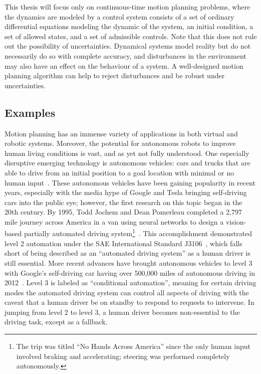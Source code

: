 This thesis will focus only on continuous-time motion planning problems, where the dynamics are modeled by a control system consists of a set of ordinary differential equations modeling the dynamic of the system, an initial condition, a set of allowed states, and a set of admissible controls. Note that this does not rule out the possibility of uncertainties. Dynamical systems model reality but do not necessarily do so with complete accuracy, and disturbances in the environment may also have an effect on the behaviour of a system. A well-designed motion planning algorithm can help to reject disturbances and be robust under uncertainties.



\subsection{Examples}

Motion planning has an immense variety of applications in both virtual and robotic systems. Moreover, the potential for autonomous robots to improve human living conditions is vast, and as yet not fully understood. One especially disruptive emerging technology is autonomous vehicles: cars and trucks that are able to drive from an initial position to a goal location with minimal or no human input~\cite{Thrun2010}. These autonomous vehicles have been gaining popularity in recent years, especially with the media hype of Google and Tesla bringing self-driving cars into the public eye; however, the first research on this topic began in the 20th century. By 1995, Todd Jochem and Dean Pomerleau completed a 2,797 mile journey across America in a van using neural networks to design a vision-based partially automated driving system\footnote{The trip was titled ``No Hands Across America'' since the only human input involved braking and accelerating; steering was performed completely autonomously.}~\cite{Jochem}. This accomplishment demonstrated level 2 automation under the SAE International Standard J3106~\cite{SAEinternational2016}, which falls short of being described as an ``automated driving system'' as a human driver is still essential. More recent advances have brought autonomous vehicles to level 3 with Google's self-driving car having over 500,000 miles of autonomous driving in 2012~\cite{Lutin2013}. Level 3 is labeled as ``conditional automation'', meaning for certain driving modes the automated driving system can control all aspects of driving with the caveat that a human driver be on standby to respond to requests to intervene. In jumping from level 2 to level 3, a human driver becomes non-essential to the driving task, except as a fallback.

